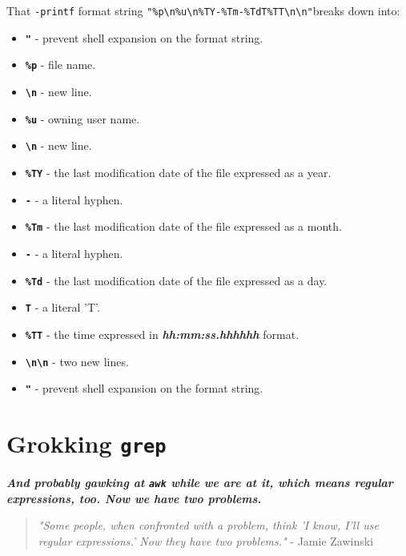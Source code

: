 \documentclass[10pt,american,]{book}
\providecommand{\tightlist}{%
  \setlength{\itemsep}{0pt}\setlength{\parskip}{0pt}}
\numberwithin{figure}{chapter}
\begin{document}
That \texttt{-printf} format string
\texttt{"\%p\textbackslash{}n\%u\textbackslash{}n\%TY-\%Tm-\%TdT\%TT\textbackslash{}n\textbackslash{}n"}breaks
down into:

\begin{itemize}
\tightlist
\item
  \textbf{\texttt{"}} - prevent shell expansion on the format string.
\item
  \textbf{\texttt{\%p}} - file name.
\item
  \textbf{\texttt{\textbackslash{}n}} - new line.
\item
  \textbf{\texttt{\%u}} - owning user name.
\item
  \textbf{\texttt{\textbackslash{}n}} - new line.
\item
  \textbf{\texttt{\%TY}} - the last modification date of the file
  expressed as a year.
\item
  \textbf{\texttt{-}} - a literal hyphen.
\item
  \textbf{\texttt{\%Tm}} - the last modification date of the file
  expressed as a month.
\item
  \textbf{\texttt{-}} - a literal hyphen.
\item
  \textbf{\texttt{\%Td}} - the last modification date of the file
  expressed as a day.
\item
  \textbf{\texttt{T}} - a literal 'T'.
\item
  \textbf{\texttt{\%TT}} - the time expressed in
  \textbf{\emph{hh:mm:ss.hhhhhh}} format.
\item
  \textbf{\texttt{\textbackslash{}n\textbackslash{}n}} - two new lines.
\item
  \textbf{\texttt{"}} - prevent shell expansion on the format string.
\end{itemize}

\hypertarget{grokking-grep}{\chapter{\texorpdfstring{Grokking
\texttt{grep}}{Grokking grep}}\label{grokking-grep}}

\textbf{\emph{And probably gawking at \texttt{awk} while we are at it,
which means regular expressions, too. Now we have two problems.}}

\begin{quote}
\emph{"Some people, when confronted with a problem, think 'I know, I'll
use regular expressions.' Now they have two problems."} - Jamie Zawinski
\end{quote}
\end{document}
